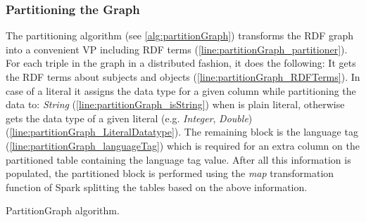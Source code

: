 \subsubsection{Partitioning the Graph}
The partitioning algorithm (see \autoref{alg:partitionGraph}) transforms the RDF graph into a convenient VP including RDF terms (\autoref{line:partitionGraph_partitioner}).
For each triple in the graph in a distributed fashion, it does the following: It gets the RDF terms about subjects and objects (\autoref{line:partitionGraph_RDFTerms}).
In case of a literal it assigns the data type for a given column while partitioning the data to: \textit{String} (\autoref{line:partitionGraph_isString}) when is plain literal, otherwise gets the data type of a given literal (e.g. \textit{Integer}, \textit{Double}) (\autoref{line:partitionGraph_LiteralDatatype}).
The remaining block is the language tag (\autoref{line:partitionGraph_languageTag}) which is required for an extra column on the partitioned table containing the language tag value.
After all this information is populated, the partitioned block is performed using the \emph{map} transformation function of Spark splitting the tables based on the above information.

\begin{algorithm}[t]
\caption{PartitionGraph algorithm.}
\label{alg:partitionGraph}
\end{algorithm}

